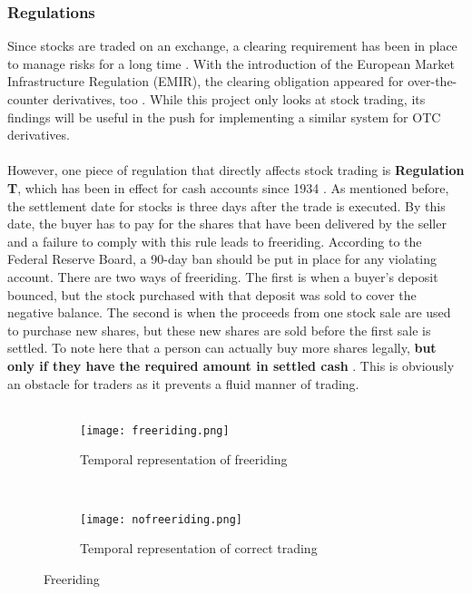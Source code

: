 \documentclass[12pt,twoside]{article}
\begin{document}
\subsubsection{Regulations}
\label{sub:Regulations}
Since stocks are traded on an exchange, a clearing requirement has been in place to manage risks for a long time \cite{etdclearing}. With the introduction of the European Market Infrastructure Regulation (EMIR), the clearing obligation appeared for over-the-counter derivatives, too \cite{emir}. While this project only looks at stock trading, its findings will be useful in the push for implementing a similar system for OTC derivatives.
\\ \\
However, one piece of regulation that directly affects stock trading is \textbf{Regulation T}, which has been in effect for cash accounts since 1934 \cite{settledate2}. As mentioned before, the settlement date for stocks is three days after the trade is executed. By this date, the buyer has to pay for the shares that have been delivered by the seller and a failure to comply with this rule leads to freeriding. According to the Federal Reserve Board, a 90-day ban should be put in place for any violating account. There are two ways of freeriding. The first is when a buyer's deposit bounced, but the stock purchased with that deposit was sold to cover the negative balance. The second is when the proceeds from one stock sale are used to purchase new shares, but these new shares are sold before the first sale is settled. To note here that a person can actually buy more shares legally, \textbf{but only if they have the required amount in settled cash} \cite{settledate}. This is obviously an obstacle for traders as it prevents a fluid manner of trading.
\\ \\
\begin{figure}[!htb]
    \centering
    \begin{subfigure}[b]{0.8\textwidth}
    	\centering
        \texttt{[image: freeriding.png]}
        \caption{Temporal representation of freeriding}
        \label{fig:fr1}
    \end{subfigure}
    ~
    \begin{subfigure}[b]{0.8\textwidth}
    	\centering
        \texttt{[image: nofreeriding.png]}
        \caption{Temporal representation of correct trading}
        \label{fig:fr2}
    \end{subfigure}
    \caption{Freeriding}
    \label{fig:freeriding}
\end{figure}
\end{document}
